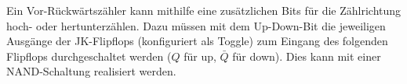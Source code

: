 Ein Vor-Rückwärtszähler kann mithilfe eine zusätzlichen Bits für die Zählrichtung
hoch- oder hertunterzählen. Dazu müssen mit dem Up-Down-Bit die jeweiligen
Ausgänge der JK-Flipflops (konfiguriert als Toggle) zum Eingang des folgenden Flipflops durchgeschaltet
werden ($Q$ für up, $\bar{Q}$ für down). Dies kann mit einer NAND-Schaltung realisiert werden.
